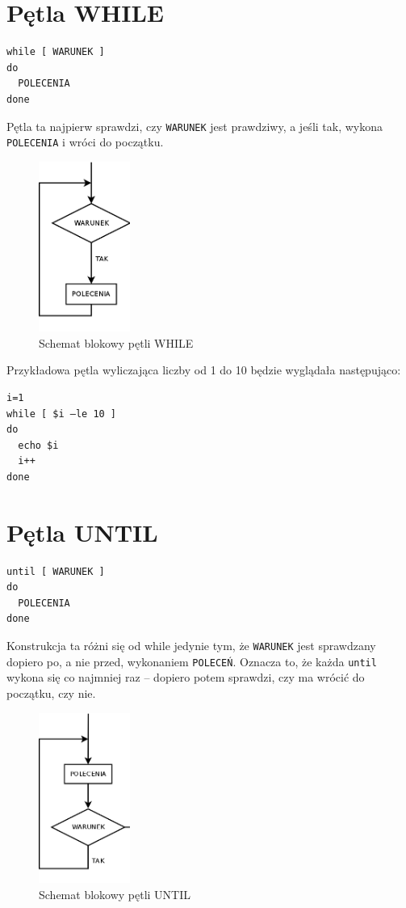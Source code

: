 \section{Pętla WHILE}
\begin{verbatim}
while [ WARUNEK ]	
do	
  POLECENIA	
done
\end{verbatim}
Pętla ta najpierw sprawdzi, czy \texttt{WARUNEK} jest prawdziwy, a jeśli tak, wykona \texttt{POLECENIA} i wróci do początku.\\
\begin{figure}[h!]
\centering
\includegraphics[width=3cm]{./ChA_5/while_diag.png}
\caption{Schemat blokowy pętli WHILE}
\end{figure}
\FloatBarrier
Przykładowa pętla wyliczająca liczby od 1 do 10 będzie wyglądała następująco:
\begin{verbatim}
i=1	
while [ $i –le 10 ]	
do	
  echo $i	
  i++	
done
\end{verbatim}

\section{Pętla UNTIL}
\begin{verbatim}
until [ WARUNEK ]	
do	
  POLECENIA	
done
\end{verbatim}
Konstrukcja ta różni się od while jedynie tym, że \texttt{WARUNEK} jest sprawdzany dopiero po, a nie przed, wykonaniem \texttt{POLECEŃ}. Oznacza to, że każda \texttt{until} wykona się co najmniej raz – dopiero potem sprawdzi, czy ma wrócić do początku, czy nie.\\
\begin{figure}[h!]
\centering
\includegraphics[width=3cm]{./ChA_5/until_diag.png}
\caption{Schemat blokowy pętli UNTIL}
\end{figure}
\FloatBarrier

